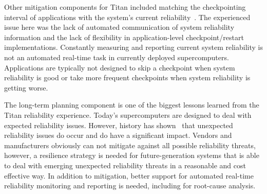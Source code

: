 Other mitigation components for Titan included matching the checkpointing
interval of applications with the system's current
reliability~\cite{bautista-gomez16reducing, 6903564}. The experienced issue here
was the lack of automated communication of system reliability information and
the lack of flexibility in application-level checkpoint/restart implementations.
Constantly measuring and reporting current system reliability is not an automated
real-time task in currently deployed supercomputers. Applications are typically
not designed to skip a checkpoint when system reliability is good or take more
frequent checkpoints when system reliability is getting worse.

The long-term planning component is one of the biggest lessons learned from the
Titan reliability experience. Today's supercomputers are designed to deal with
expected reliability issues. However, history has shown~\cite{geist12kill} that
unexpected reliability issues do occur and do have a significant impact. Vendors
and manufacturers obviously can not mitigate against all possible reliability
threats, however, a resilience strategy is needed for future-generation systems
that is able to deal with emerging unexpected reliability threats in a
reasonable and cost effective way. In addition to mitigation, better support for
automated real-time reliability monitoring and reporting is needed, including
for root-cause analysis.



